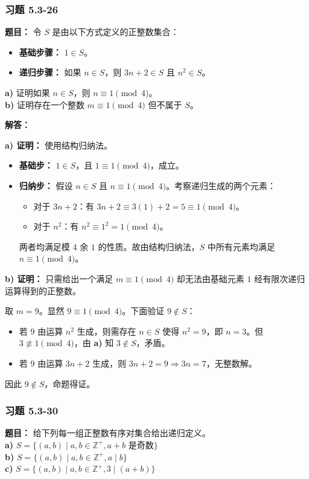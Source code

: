 \documentclass[11pt,UTF8]{article}
\begin{document}
\subsubsection*{习题 5.3-26}
\textbf{题目：} 令 $S$ 是由以下方式定义的正整数集合：
\begin{itemize}
    \item \textbf{基础步骤：} $1 \in S$。
    \item \textbf{递归步骤：} 如果 $n \in S$，则 $3n+2 \in S$ 且 $n^2 \in S$。
\end{itemize}
\textbf{a)} 证明如果 $n \in S$，则 $n \equiv 1 \pmod 4$。\\
\textbf{b)} 证明存在一个整数 $m \equiv 1 \pmod 4$ 但不属于 $S$。

\textbf{解答：}

\textbf{a) 证明：} 使用结构归纳法。
\begin{itemize}
    \item \textbf{基础步：} $1 \in S$，且 $1 \equiv 1 \pmod 4$，成立。
    \item \textbf{归纳步：} 假设 $n \in S$ 且 $n \equiv 1 \pmod 4$。考察递归生成的两个元素：
    \begin{itemize}
        \item 对于 $3n+2$：有 $3n+2 \equiv 3(1)+2 = 5 \equiv 1 \pmod 4$。
        \item 对于 $n^2$：有 $n^2 \equiv 1^2 = 1 \pmod 4$。
    \end{itemize}
    两者均满足模 $4$ 余 $1$ 的性质。故由结构归纳法，$S$ 中所有元素均满足 $n \equiv 1 \pmod 4$。
\end{itemize}

\textbf{b) 证明：} 只需给出一个满足 $m \equiv 1 \pmod 4$ 却无法由基础元素 $1$ 经有限次递归运算得到的正整数。

取 $m = 9$。显然 $9 \equiv 1 \pmod 4$。下面验证 $9 \notin S$：
\begin{itemize}
    \item 若 $9$ 由运算 $n^2$ 生成，则需存在 $n \in S$ 使得 $n^2 = 9$，即 $n=3$。但 $3 \not\equiv 1 \pmod 4$，由 \textbf{a)} 知 $3 \notin S$，矛盾。
    \item 若 $9$ 由运算 $3n+2$ 生成，则 $3n+2 = 9 \Rightarrow 3n = 7$，无整数解。
\end{itemize}
因此 $9 \notin S$，命题得证。

\subsubsection*{习题 5.3-30}
\textbf{题目：} 给下列每一组正整数有序对集合给出递归定义。\\
\textbf{a)} $S = \{(a,b) \mid a,b \in \mathbb{Z}^+, a+b \text{ 是奇数}\}$\\
\textbf{b)} $S = \{(a,b) \mid a,b \in \mathbb{Z}^+, a \mid b\}$\\
\textbf{c)} $S = \{(a,b) \mid a,b \in \mathbb{Z}^+, 3 \mid (a+b)\}$
\end{document}

